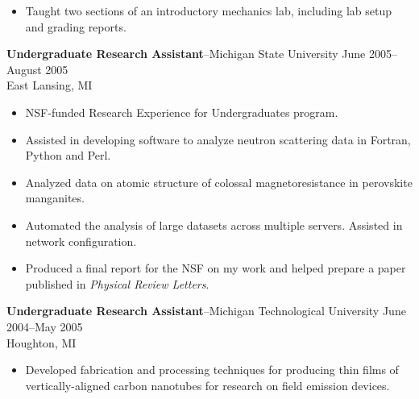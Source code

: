 \documentclass[10pt]{article}
\newcommand{\jobitem}[4]{
    \vspace{4pt}

    \textbf{#1}--#2 \hfill #3\\ #4

    \vspace{-8pt}
}
\begin{document}
%
\begin{itemize}\setlength{\itemsep}{0cm}
\item Taught two sections of an introductory mechanics lab, including lab setup and grading reports.
\end{itemize}


\jobitem{Undergraduate Research Assistant}{Michigan State University}{June 2005--August 2005}{East Lansing, MI}

\begin{itemize}\setlength{\itemsep}{0cm}
  \setlength{\parskip}{0cm}
\item NSF-funded Research Experience for Undergraduates program.
\item Assisted in developing software to analyze neutron scattering data in Fortran, Python and Perl.
\item Analyzed data on atomic structure of colossal magnetoresistance in perovskite manganites.
\item Automated the analysis of large datasets across multiple servers.  Assisted in network configuration.
\item Produced a final report for the NSF on my work and helped prepare a paper published in \textit{Physical Review Letters}.
\end{itemize}


\jobitem{Undergraduate Research Assistant}{Michigan Technological University}{June 2004--May 2005}{Houghton, MI}

\begin{itemize}\setlength{\itemsep}{0cm}
  \setlength{\parskip}{0cm}
\item Developed fabrication and processing techniques for producing thin films of vertically-aligned carbon nanotubes
for research on field emission devices.
\end{itemize}
\end{document}
